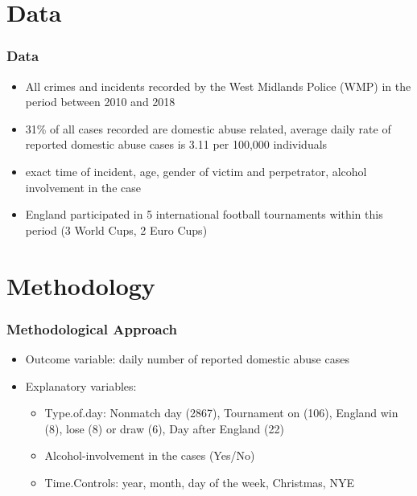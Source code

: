 \documentclass[hyperref={pdfpagelabels=false}]{beamer}
\begin{document}

\section{Data} 

\begin{frame}
\frametitle{Data}
\begin{itemize}
\item All crimes and incidents recorded by the West Midlands Police (WMP) in the period between 2010 and 2018 
\item 31\% of all cases recorded are domestic abuse related, average daily rate of reported domestic abuse cases is 3.11 per 100,000 individuals
\item exact time of incident, age, gender of victim and perpetrator, alcohol involvement in the case
\item England participated in 5 international football tournaments within this period (3 World Cups, 2 Euro Cups)
\end{itemize} 
\end{frame}

\section{Methodology} 

\begin{frame}
\frametitle{Methodological Approach}
\begin{itemize}
\item Outcome variable: daily number of reported domestic abuse cases
\item Explanatory variables: 
 \begin{itemize}
\item Type.of.day: Nonmatch day (2867), Tournament on (106), England win (8), lose (8) or draw (6), Day after England (22)
\item Alcohol-involvement in the cases (Yes/No)
\item Time.Controls: year, month, day of the week, Christmas, NYE
\end{itemize} 
\end{itemize} 
\end{frame}
\end{document}
